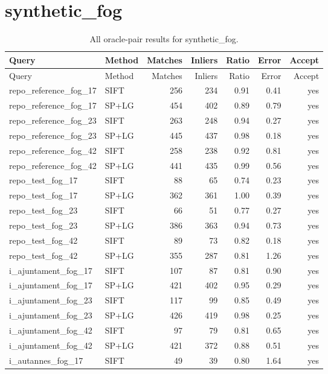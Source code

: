 \section{synthetic\_fog}
\begingroup\scriptsize\setlength{\tabcolsep}{3pt}
\begin{longtable}{llrrrrr}
\caption{All oracle-pair results for synthetic\_fog.}\\
\toprule
Query & Method & Matches & Inliers & Ratio & Error & Accept\\\midrule\endfirsthead
\toprule Query & Method & Matches & Inliers & Ratio & Error & Accept\\\midrule\endhead
\bottomrule\endfoot
repo\_reference\_fog\_17 & SIFT & 256 & 234 & 0.91 & 0.41 & yes \\
repo\_reference\_fog\_17 & SP+LG & 454 & 402 & 0.89 & 0.79 & yes \\
repo\_reference\_fog\_23 & SIFT & 263 & 248 & 0.94 & 0.27 & yes \\
repo\_reference\_fog\_23 & SP+LG & 445 & 437 & 0.98 & 0.18 & yes \\
repo\_reference\_fog\_42 & SIFT & 258 & 238 & 0.92 & 0.81 & yes \\
repo\_reference\_fog\_42 & SP+LG & 441 & 435 & 0.99 & 0.56 & yes \\
repo\_test\_fog\_17 & SIFT & 88 & 65 & 0.74 & 0.23 & yes \\
repo\_test\_fog\_17 & SP+LG & 362 & 361 & 1.00 & 0.39 & yes \\
repo\_test\_fog\_23 & SIFT & 66 & 51 & 0.77 & 0.27 & yes \\
repo\_test\_fog\_23 & SP+LG & 386 & 363 & 0.94 & 0.73 & yes \\
repo\_test\_fog\_42 & SIFT & 89 & 73 & 0.82 & 0.18 & yes \\
repo\_test\_fog\_42 & SP+LG & 355 & 287 & 0.81 & 1.26 & yes \\
i\_ajuntament\_fog\_17 & SIFT & 107 & 87 & 0.81 & 0.90 & yes \\
i\_ajuntament\_fog\_17 & SP+LG & 421 & 402 & 0.95 & 0.29 & yes \\
i\_ajuntament\_fog\_23 & SIFT & 117 & 99 & 0.85 & 0.49 & yes \\
i\_ajuntament\_fog\_23 & SP+LG & 426 & 419 & 0.98 & 0.25 & yes \\
i\_ajuntament\_fog\_42 & SIFT & 97 & 79 & 0.81 & 0.65 & yes \\
i\_ajuntament\_fog\_42 & SP+LG & 421 & 372 & 0.88 & 0.51 & yes \\
i\_autannes\_fog\_17 & SIFT & 49 & 39 & 0.80 & 1.64 & yes \\

\end{longtable}
